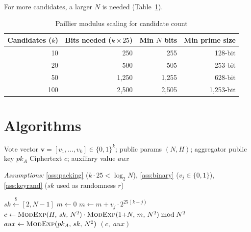 \documentclass[11pt, a4paper]{article}
\begin{document}
For more candidates, a larger $N$ is needed (Table~\ref{tab:scaling}).

\begin{table}[h]
\centering
\caption{Paillier modulus scaling for candidate count}
\label{tab:scaling}
\begin{tabular}{rrrr}
\toprule
Candidates ($k$) & Bits needed ($k \times 25$) & Min $N$ bits & Min prime size \\
\midrule
10 & 250 & 255 & 128-bit \\
20 & 500 & 505 & 253-bit \\
50 & 1{,}250 & 1{,}255 & 628-bit \\
100 & 2{,}500 & 2{,}505 & 1{,}253-bit \\
\bottomrule
\end{tabular}
\end{table}

\section{Algorithms}\label{sec:algorithms}

\begin{algorithm}[h]
\caption{Voter Encryption (client-side, WebAssembly)}
\label{alg:encrypt}
\begin{algorithmic}[1]
\Require Vote vector $\mathbf{v} = [v_1, \ldots, v_k] \in \{0,1\}^k$; public params $(N, H)$; aggregator public key $pk_A$
\Ensure Ciphertext $c$; auxiliary value $aux$

\Statex \textit{Assumptions:} \ref{ass:packing} ($k \cdot 25 < \log_2 N$), \ref{ass:binary} ($v_j \in \{0,1\}$), \ref{ass:keyrand} ($sk$ used as randomness $r$)

\State $sk \xleftarrow{\$} [2, N-1]$ 
\State $m \gets 0$
    \State $m \gets m + v_j \cdot 2^{25(k-j)}$ 
\EndFor
\State $c \gets \textsc{ModExp}(H,\, sk,\, N^2) \cdot \textsc{ModExp}(1{+}N,\, m,\, N^2) \bmod N^2$
\State $aux \gets \textsc{ModExp}(pk_A,\, sk,\, N^2)$
\State \Return $(c,\; aux)$
\end{algorithmic}
\end{algorithm}
\end{document}
